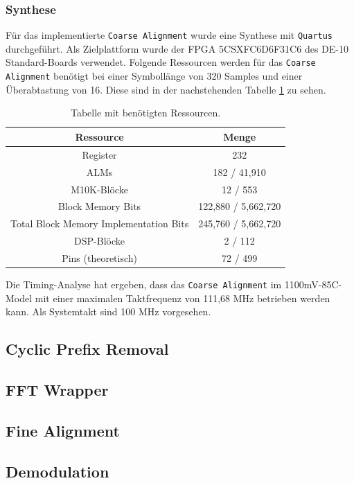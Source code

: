 \subsubsection{Synthese}
Für das implementierte \texttt{Coarse Alignment} wurde eine Synthese mit \texttt{Quartus} durchgeführt. Als Zielplattform wurde der FPGA 5CSXFC6D6F31C6 des DE-10 Standard-Boards verwendet. Folgende Ressourcen werden für das \texttt{Coarse Alignment} benötigt bei einer Symbollänge von 320 Samples und einer Überabtastung von 16.
Diese sind in der nachstehenden Tabelle \ref{tab:resources_coarse} zu sehen.

\begin{table}[H]
\centering
\begin{tabular}{|c|c|}
\hline
\textbf{Ressource} & \textbf{Menge} \\ \hline
Register & 232 \\ \hline
ALMs & 182 / 41,910 \\ \hline
M10K-Blöcke & 12 / 553 \\ \hline
Block Memory Bits & 122,880 / 5,662,720 \\ \hline
Total Block Memory Implementation Bits & 245,760 / 5,662,720 \\ \hline
DSP-Blöcke & 2 / 112 \\ \hline
Pins (theoretisch) & 72 / 499 \\ \hline
\end{tabular}
\caption{Tabelle mit benötigten Ressourcen.}
\label{tab:resources_coarse}
\end{table}

Die Timing-Analyse hat ergeben, dass das \texttt{Coarse Alignment} im 1100mV-85C-Model mit einer maximalen Taktfrequenz von 111,68 MHz betrieben werden kann. Als Systemtakt sind 100 MHz vorgesehen.

\subsection{Cyclic Prefix Removal}

\subsection{FFT Wrapper}

\subsection{Fine Alignment}

\subsection{Demodulation}






